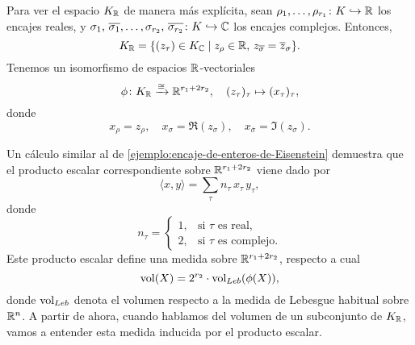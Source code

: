 \begin{comentario}
  Para ver el espacio $K_{\mathbb{R}}$ de manera más explícita, sean
  $\rho_1, \ldots, \rho_{r_1}\colon K \hookrightarrow \mathbb{R}$
  los encajes reales, y
  $\sigma_1, \, \overline{\sigma_1}, \ldots, \sigma_{r_2}, \, \overline{\sigma_{r_2}} \colon K \hookrightarrow \mathbb{C}$
  los encajes complejos. Entonces,
  $$K_{\mathbb{R}} = \{ (z_\tau) \in K_{\mathbb{C}} \mid z_\rho \in \mathbb{R}, \, z_{\overline{\sigma}} = \overline{z}_\sigma \}.$$
  Tenemos un isomorfismo de espacios $\mathbb{R}$-vectoriales
  \[ \phi\colon K_{\mathbb{R}} \xrightarrow{\cong} \mathbb{R}^{r_1 + 2 r_2}, \quad
  (z_\tau)_\tau \mapsto (x_\tau)_\tau, \]
  donde
  \[ x_\rho = z_\rho, \quad
  x_\sigma = \Re (z_\sigma), \quad
  x_{\overline{\sigma}} = \Im (z_\sigma). \]

  Un cálculo similar al de \ref{ejemplo:encaje-de-enteros-de-Eisenstein}
  demuestra que el producto escalar correspondiente sobre $\mathbb{R}^{r_1 + 2 r_2}$
  viene dado por
  $$\langle x,y\rangle = \sum_\tau n_\tau \, x_\tau \, y_\tau,$$
  donde
  \[ n_\tau = \begin{cases}
    1, & \text{si }\tau\text{ es real},\\
    2, & \text{si }\tau\text{ es complejo}.
  \end{cases} \]
  Este producto escalar define una medida sobre $\mathbb{R}^{r_1 + 2r_2}$, respecto
  a cual
  $$\operatorname{vol} (X) = 2^{r_2}\cdot \operatorname{vol}_{Leb} (\phi (X)),$$
  donde $\operatorname{vol}_{Leb}$ denota el volumen respecto a la medida de Lebesgue
  habitual sobre $\mathbb{R}^n$. A partir de ahora, cuando hablamos del volumen de un
  subconjunto de $K_{\mathbb{R}}$, vamos a entender esta medida inducida por el producto
  escalar.
\end{comentario}

